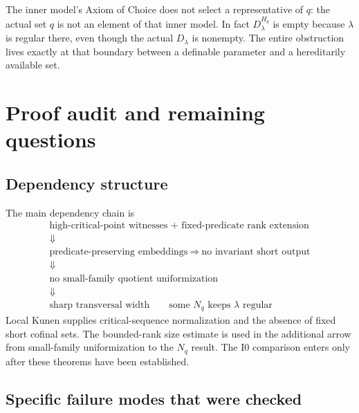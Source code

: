 \documentclass[11pt,letterpaper]{article}
\theoremstyle{definition}
\numberwithin{equation}{section}
\newcommand{\Izero}{\mathrm{I0}}
\begin{document}
The inner model's Axiom of Choice does not select a representative of $q$: the actual set $q$ is not an element of that inner model. In fact $D_\lambda^{H_q}$ is empty because $\lambda$ is regular there, even though the actual $D_\lambda$ is nonempty. The entire obstruction lives exactly at that boundary between a definable parameter and a hereditarily available set.

\section{Proof audit and remaining questions}\label{sec:audit}

\subsection{Dependency structure}

The main dependency chain is
\[
\begin{gathered}
\text{high-critical-point witnesses + fixed-predicate rank extension}\\
\Downarrow\\
\text{predicate-preserving embeddings}
\ \Longrightarrow\ \text{no invariant short output}\\
\Downarrow\\
\text{no small-family quotient uniformization}\\
\Downarrow\\
\text{sharp transversal width}
\qquad\text{some }N_q\text{ keeps }\lambda\text{ regular}
\end{gathered}
\]
Local Kunen supplies critical-sequence normalization and the absence of fixed short cofinal sets. The bounded-rank size estimate is used in the additional arrow from small-family uniformization to the $N_q$ result. The $\Izero$ comparison enters only after these theorems have been established.

\subsection{Specific failure modes that were checked}
\end{document}
